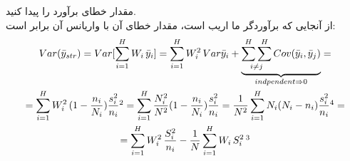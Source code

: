 مقدار خطای برآورد را پیدا کنید. 
\\
از آنجایی که برآوردگر ما اریب است، مقدار خطای آن با واریانس آن برابر است:
\begin{multline*}
	Var(\bar{y}_{str})
	=Var[\sum_{i=1}^{H}W_i\,\bar{y}_i]
	=\sum_{i=1}^{H}W_i^2\, Var{\bar{y}_i}+\underset{indpendent\Rightarrow 0}{\underbrace{\underset{i\neq j}{\sum^H\sum^H}\, Cov(\bar{y}_i,\bar{y}_j)}}
	=\\=
	\sum_{i=1}^{H}W_i^2\, (1-\frac{n_i}{N_i})\frac{s_i^2}{n_i}\footnotemark[2]
	=\sum_{i=1}^{H}\frac{N_i^2}{N^2}(1-\frac{n_i}{N_i})\frac{s_i^2}{n_i}
	=\frac{1}{N^2}\sum_{i=1}^{H}N_i(N_i-n_i)\frac{s_i^2}{n_i}\footnotemark[4]
	=\\=
	\sum_{i=1}^{H}W_i^2\, \frac{S_i^2}{n_i}-\frac{1}{N}\sum_{i=1}^{H}W_i\, S_i^{2}\,\footnotemark[3]
\end{multline*}
